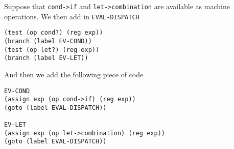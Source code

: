 \documentclass[a4paper,12pt]{article}
\begin{document}
Suppose that \lstinline!cond->if! and \lstinline!let->combination! are
available as machine operations.  We then add in \lstinline!EVAL-DISPATCH!

\begin{lstlisting}
(test (op cond?) (reg exp))
(branch (label EV-COND))
(test (op let?) (reg exp))
(branch (label EV-LET))
\end{lstlisting}

And then we add the following piece of code

\begin{lstlisting}
EV-COND
(assign exp (op cond->if) (reg exp))
(goto (label EVAL-DISPATCH))

EV-LET
(assign exp (op let->combination) (reg exp))
(goto (label EVAL-DISPATCH))
\end{lstlisting}
\end{document}
